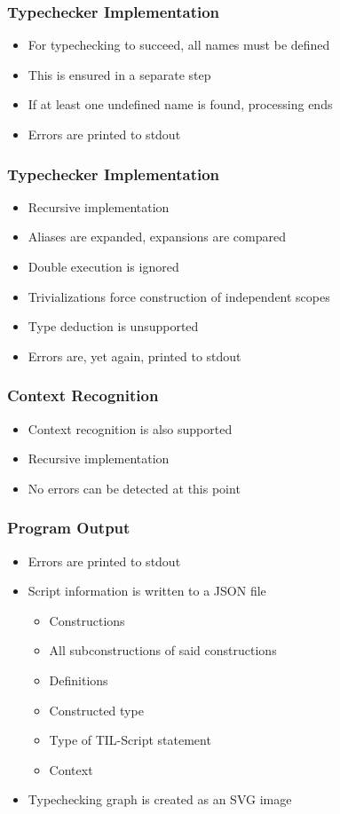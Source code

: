 \documentclass{beamer}
\begin{document}
\begin{frame}
    \frametitle{Typechecker Implementation}
    \begin{itemize}
        \item For typechecking to succeed, all names must be defined
        \item This is ensured in a separate step
        \item If at least one undefined name is found, processing ends
        \item Errors are printed to stdout
    \end{itemize}
\end{frame}

\begin{frame}
    \frametitle{Typechecker Implementation}
    \begin{itemize}
        \item Recursive implementation
        \item Aliases are expanded, expansions are compared
        \item Double execution is ignored
        \item Trivializations force construction of independent scopes
        \item Type deduction is unsupported
        \item Errors are, yet again, printed to stdout
    \end{itemize}
\end{frame}

\begin{frame}
    \frametitle{Context Recognition}
    \begin{itemize}
        \item Context recognition is also supported
        \item Recursive implementation
        \item No errors can be detected at this point
    \end{itemize}
\end{frame}

\begin{frame}
    \frametitle{Program Output}
    \begin{itemize}
        \item Errors are printed to stdout
        \item Script information is written to a JSON file
            \begin{itemize}
                \item Constructions
                \item All subconstructions of said constructions
                \item Definitions
                \item Constructed type
                \item Type of TIL-Script statement
                \item Context
            \end{itemize}
        \item Typechecking graph is created as an SVG image
    \end{itemize}
\end{frame}
\end{document}
